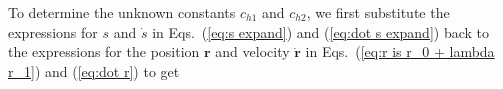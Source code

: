 \documentclass[twocolumn,showpacs,preprintnumbers,amsmath,amssymb]{revtex4}
\begin{document}
To determine the unknown constants $c_{h1}$ and $c_{h2}$, we first substitute the expressions for $s$ and $\dot s$ in Eqs.~(\ref{eq:s  expand}) and (\ref{eq:dot s expand}) back to the expressions for the position $\mathbf r$ and velocity $\dot{\mathbf r}$ in Eqs.~(\ref{eq:r is r_0 + lambda r_1}) and (\ref{eq:dot r}) to get
%
\end{document}
